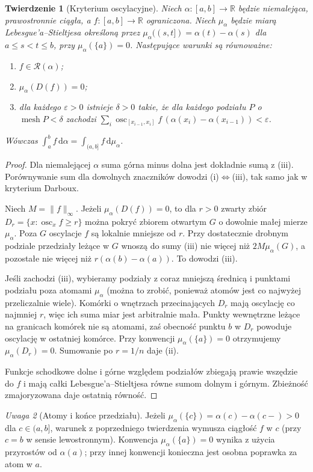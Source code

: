 \documentclass[11pt,a4paper]{article}
\numberwithin{equation}{section}
\theoremstyle{plain}
\newtheorem{twierdzenie}{Twierdzenie}[section]
\theoremstyle{definition}
\theoremstyle{remark}
\newtheorem{uwaga}[twierdzenie]{Uwaga}
\newcommand{\R}{\mathbb R}
\newcommand{\osc}{\operatorname{osc}}
\newcommand{\mesh}{\operatorname{mesh}}
\begin{document}
\begin{twierdzenie}[Kryterium oscylacyjne]
Niech $\alpha:[a,b]\to\R$ będzie niemalejąca, prawostronnie ciągła, a $f:[a,b]\to\R$ ograniczona. Niech $\mu_\alpha$ będzie miarą Lebesgue'a--Stieltjesa określoną przez $\mu_\alpha((s,t])=\alpha(t)-\alpha(s)$ dla $a\le s<t\le b$, przy $\mu_\alpha(\{a\})=0$. Następujące warunki są równoważne:
\begin{enumerate}[label=(\roman*)]
\item $f\in\mathcal R(\alpha)$;
\item $\mu_\alpha(D(f))=0$;
\item dla każdego $\varepsilon>0$ istnieje $\delta>0$ takie, że dla każdego podziału $P$ o $\mesh P<\delta$ zachodzi $\sum_i\osc_{[x_{i-1},x_i]}f\,(\alpha(x_i)-\alpha(x_{i-1}))<\varepsilon$.
\end{enumerate}
Wówczas $\int_a^b f\,\mathrm d\alpha=\int_{(a,b]}f\,\mathrm d\mu_\alpha$.
\end{twierdzenie}
\begin{proof}
Dla niemalejącej $\alpha$ suma górna minus dolna jest dokładnie sumą z (iii). Porównywanie sum dla dowolnych znaczników dowodzi (i)$\Leftrightarrow$(iii), tak samo jak w kryterium Darboux.

Niech $M=\|f\|_\infty$. Jeżeli $\mu_\alpha(D(f))=0$, to dla $r>0$ zwarty zbiór $D_r=\{x:\osc_x f\ge r\}$ można pokryć zbiorem otwartym $G$ o dowolnie małej mierze $\mu_\alpha$. Poza $G$ oscylacje $f$ są lokalnie mniejsze od $r$. Przy dostatecznie drobnym podziale przedziały leżące w $G$ wnoszą do sumy (iii) nie więcej niż $2M\mu_\alpha(G)$, a pozostałe nie więcej niż $r(\alpha(b)-\alpha(a))$. To dowodzi (iii).

Jeśli zachodzi (iii), wybieramy podziały z coraz mniejszą średnicą i punktami podziału poza atomami $\mu_\alpha$ (można to zrobić, ponieważ atomów jest co najwyżej przeliczalnie wiele). Komórki o wnętrzach przecinających $D_r$ mają oscylację co najmniej $r$, więc ich suma miar jest arbitralnie mała. Punkty wewnętrzne leżące na granicach komórek nie są atomami, zaś obecność punktu $b$ w $D_r$ powoduje oscylację w ostatniej komórce. Przy konwencji $\mu_\alpha(\{a\})=0$ otrzymujemy $\mu_\alpha(D_r)=0$. Sumowanie po $r=1/n$ daje (ii).

Funkcje schodkowe dolne i górne względem podziałów zbiegają prawie wszędzie do $f$ i mają całki Lebesgue'a--Stieltjesa równe sumom dolnym i górnym. Zbieżność zmajoryzowana daje ostatnią równość.
\end{proof}
\begin{uwaga}[Atomy i końce przedziału]
Jeżeli $\mu_\alpha(\{c\})=\alpha(c)-\alpha(c-)>0$ dla $c\in(a,b]$, warunek z poprzedniego twierdzenia wymusza ciągłość $f$ w $c$ (przy $c=b$ w sensie lewostronnym). Konwencja $\mu_\alpha(\{a\})=0$ wynika z użycia przyrostów od $\alpha(a)$; przy innej konwencji konieczna jest osobna poprawka za atom w $a$.
\end{uwaga}
\end{document}
